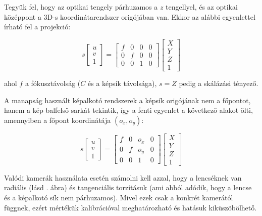 Tegyük fel, hogy az optikai tengely párhuzamos a $z$ tengellyel, és az optikai középpont a 3D-s koordinátarendszer origójában van. Ekkor az alábbi egyenlettel írható fel a projekció:

\[s \left[\begin{array}{c}
u \\ 
v \\
1
\end{array}\right] = \left[\begin{array}{cccc}
f & 0 & 0 & 0 \\ 
0 & f & 0 & 0\\
0 & 0 & 1 & 0
\end{array}\right] \left[\begin{array}{c}
X \\ 
Y \\
Z \\
1
\end{array}\right]\]

ahol $f$ a fókusztávolság ($C$ és a képsík távolsága), $s = Z$ pedig a skálázási tényező.

A manapság használt képalkotó rendszerek a képsík origójának nem a főpontot, hanem a kép balfelső sarkát tekintik, így a fenti egyenlet a következő  alakot ölti, amennyiben a főpont koordinátája $(o_x, o_y)$:

\[s \left[\begin{array}{c}
u \\ 
v \\
1
\end{array}\right] = \left[\begin{array}{cccc}
f & 0 & o_x & 0 \\ 
0 & f & o_y & 0 \\
0 & 0 & 1 & 0
\end{array}\right] \left[\begin{array}{c}
X \\ 
Y \\
Z \\
1
\end{array}\right]\]

Valódi kamerák használata esetén számolni kell azzal, hogy a lencséknek van radiális (lásd . ábra) és tangenciális torzításuk (ami abból adódik, hogy a lencse és a képalkotó sík nem párhuzamos). Mivel ezek csak a konkrét kamerától függnek, ezért mértékük kalibrációval meghatározható és hatásuk kiküszöbölhető. 

